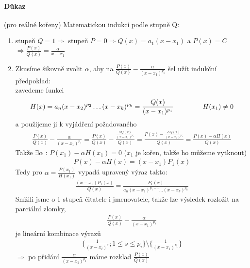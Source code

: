 \documentclass[a4paper,10pt]{article}
\begin{document}
\paragraph{Důkaz}
(pro reálné kořeny) Matematickou indukcí podle stupně Q:
\begin{enumerate}
	\item stupeň $Q = 1 \Rightarrow$ stupeň $P = 0 \Rightarrow Q(x) = a_1(x-x_1) $ a $ P(x) = C $
		$\Rightarrow  \frac{P(x)}{Q(x)} = \frac{\alpha}{x-x_1} $

	\item
Zkusíme šikovně zvolit $\alpha$, aby na $ \displaystyle \frac{P(x)}{Q(x)} - \frac{\alpha}{(x-x_1)^{p_1}} $ šel užít indukční předpoklad: \\
zavedeme funkci
\begin{align}
	H(x) = a_n(x-x_2)^{p_2} \dots (x-x_k)^{p_k} = \frac{Q(x)}{(x-x_1)^{p_1}}    \parbox{1.5cm}{~} H(x_1) \ne 0
\end{align}
a použijeme ji k vyjádření požadovaného
\begin{align}
	\frac{P(x)}{Q(x)} - \frac{\alpha}{(x-x_1)^{p_1}} 
	 = \frac{P(x)}{Q(x)} - \frac{\displaystyle \frac{\alpha Q(x)}{(x-x_1)^{p_1}} }{Q(x)} 
	 = \frac{P(x) - \displaystyle \frac{\alpha Q(x)}{(x-x_1)^{p_1}} }{Q(x)} 
	 = \frac{P(x) - \alpha H(x)}{Q(x)}
\end{align}
Takže $ \exists \alpha$ : $ P(x_1) - \alpha H(x_1) = 0 $ ($x_1$ je kořen, takže ho můžeme vytknout)
\begin{align}
	P(x) - \alpha H(x) = (x-x_1) P_1(x)
\end{align}
Tedy pro $ \alpha = \displaystyle \frac{P(x_1)}{H(x_1)} $ vypadá upravený výraz takto:
\begin{align}
	\frac{(x-x_1)P_1(x)}{Q(x)} = \frac{P_1(x)}{a_n (x-x_1)^{p_1-1} \dots (x-x_k)^{p_k}}
\end{align}
Snížili jsme o 1 stupeň čitatele i jmenovatele, takže lze výsledek rozložit na parciální zlomky,
\begin{align}
	\displaystyle \frac{P(x)}{Q(x)} - \frac{\alpha}{(x-x_1)^{p_1}}
\end{align}
je lineární kombinace výrazů  
\begin{align}
	\displaystyle \{\frac{1}{(x-x_i)^{s}}; 1 \le s \le p_i \} \setminus 
	\{ \frac{1}{(x-x_1)^{p_1}} \}
\end{align}
$\Rightarrow$ po přidání $\displaystyle \frac{\alpha}{(x-x_1)^{p_1}} $ máme rozklad $ \displaystyle \frac{P(x)}{Q(x)} $
\end{enumerate}
\end{document}
